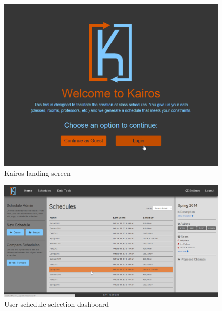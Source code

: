 \documentclass{extarticle}
\begin{document}
\begin{appendices}
\begin{figure}[!ht]
    \centering
    \includegraphics[width=1.0\textwidth]{img/landing}
    \caption{Kairos landing screen}
    \label{fig:landing}
\end{figure}

\begin{figure}[!ht]
    \centering
    \includegraphics[width=1.0\textwidth]{img/dashboard_02}
    \caption{User schedule selection dashboard}
    \label{fig:dashboard_02}
\end{figure}


\end{appendices}
\end{document}
